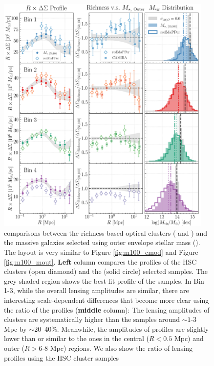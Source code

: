 \documentclass[fleqn,usenatbib,useAMS]{mnras}
\begin{document}
\begin{CJK*}{UTF8}{gbsn}
\begin{figure}
    \centering
    \includegraphics[width=0.95\textwidth]{figure/fig_9}
    \caption{
        \topn{} comparisons between the richness-based optical clusters (\redm{} and \camira{})
        and the massive galaxies selected using outer envelope stellar mass ().
        The layout is very similar to Figure \ref{fig:m100_cmod} and Figure \ref{fig:m100_mout}.
        \textbf{Left} column compares the \rdsigma{} profiles of the HSC \redm{} clusters
        (open diamond) and the  (solid circle) selected samples.
        The grey shaded region shows the best-fit profile of the  samples.
        In Bin 1-3, while the overall lensing amplitudes are similar, there are interesting
        scale-dependent differences that become more clear using the ratio of the \dsigma{}
        profiles (\textbf{middle} column):
        The lensing amplitudes of \redm{} clusters are systematically higher than the
         samples around $\sim 1$-3 Mpc by $\sim$20--40\%.
        Meanwhile, the amplitudes of \redm{} \dsigma{} profiles are slightly lower than or
        similar to the  ones in the central ($R < 0.5$ Mpc) and outer
        ($R>6$-8 Mpc) regions.
        We also show the ratio of lensing profiles using the HSC \camira{} cluster samples
}
\end{figure}
\end{CJK*}
\end{document}
